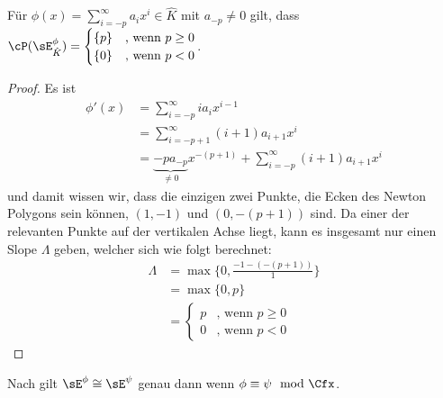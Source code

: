 \begin{lem}
Für $\phi(x)=\sum_{i=-p}^\infty a_ix^i\in\hat K$ mit $a_{-p}\neq0$ gilt, dass
$\cP(\sE_{\hat K}^\phi)=
\begin{cases}
\{p\} &\text{, wenn }p\geq0
\\\{0\} &\text{, wenn }p<0
\end{cases}
$.
\end{lem}
\begin{proof} 
Es ist 
\begin{align*}
\phi'(x) &=\sum_{i=-p}^\infty ia_ix^{i-1}
\\&=\sum_{i=-{p+1}}^\infty (i+1)a_{i+1}x^{i}
\\&=\underset{\neq0}{\underbrace{-pa_{-p}}}x^{-(p+1)}
  +\sum_{i=-{p}}^\infty (i+1)a_{i+1}x^{i}
\end{align*}
und damit wissen wir, dass die einzigen zwei Punkte, die Ecken des Newton
Polygons sein können, $(1,-1)$ und $(0,-(p+1))$ sind. Da einer der relevanten
Punkte auf der vertikalen Achse liegt, kann es insgesamt nur einen Slope
$\Lambda$ geben, welcher sich wie folgt berechnet:
\begin{align*}
\Lambda&=\max\{0,\frac{-1-(-(p+1))}{1}\}
\\&=\max\{0,p\}
\\&=\begin{cases}
  p &\text{, wenn }p\geq0
\\0 &\text{, wenn }p<0
\end{cases}
\end{align*}

\iffalse
\begin{figure}[H] %
\begin{center}
  \begin{tikzpicture}[scale=1,descr/.style={fill=white,inner sep=2.5pt}]
  \def\myPoints{0/-6,1/-1}
  \def\myPath{ -- node[descr]{$p$} (1,-1)}
  \myPlotFunction[nogrid]{\myPoints}{\myPath}{1}{-6}{0}{$N(\sE_{\hat K}^\phi)$}
  \end{tikzpicture}
\end{center}
\caption{Newton-Polygon zu $\sE_{\hat K}^\phi$}
\end{figure}
\fi
\end{proof}

\begin{bem} \label{bem:FormRang1VR}
Nach \cite[1.a]{sabbah_Fourier-local} gilt $\sE^\phi\cong\sE^\psi$ genau dann
wenn $\phi\equiv\psi \mod \Cfx$.
\end{bem}

